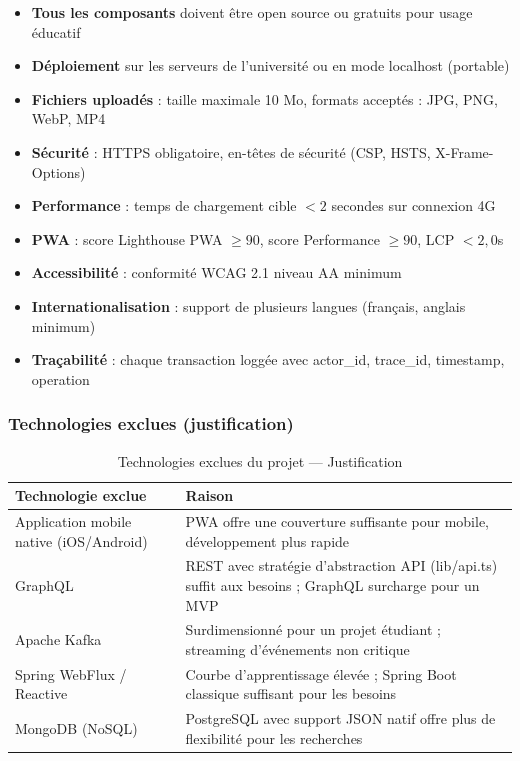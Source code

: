 \documentclass[12pt,a4paper]{report}
\begin{document}
\begin{itemize}[leftmargin=1.5cm]
  \item \textbf{Tous les composants} doivent être open source ou gratuits pour usage éducatif
  \item \textbf{Déploiement} sur les serveurs de l'université ou en mode localhost (portable)
  \item \textbf{Fichiers uploadés} : taille maximale 10 Mo, formats acceptés : JPG, PNG, WebP, MP4
  \item \textbf{Sécurité} : HTTPS obligatoire, en-têtes de sécurité (CSP, HSTS, X-Frame-Options)
  \item \textbf{Performance} : temps de chargement cible $< 2$ secondes sur connexion 4G
  \item \textbf{PWA} : score Lighthouse PWA $\geq 90$, score Performance $\geq 90$, LCP $< 2,0$s
  \item \textbf{Accessibilité} : conformité WCAG 2.1 niveau AA minimum
  \item \textbf{Internationalisation} : support de plusieurs langues (français, anglais minimum)
  \item \textbf{Traçabilité} : chaque transaction loggée avec actor\_id, trace\_id, timestamp, operation
\end{itemize}

\subsubsection*{Technologies exclues (justification)}

\begin{table}[H]
\centering
\caption{Technologies exclues du projet --- Justification}
\label{tab:excluded_tech}
\small
\begin{tabular}{|p{}|p{}|}
\hline
\textbf{Technologie exclue} & \textbf{Raison} \\
\hline
Application mobile native (iOS/Android) & PWA offre une couverture suffisante pour mobile, développement plus rapide \\
\hline
GraphQL & REST avec stratégie d'abstraction API (lib/api.ts) suffit aux besoins ; GraphQL surcharge pour un MVP \\
\hline
Apache Kafka & Surdimensionné pour un projet étudiant ; streaming d'événements non critique \\
\hline
Spring WebFlux / Reactive & Courbe d'apprentissage élevée ; Spring Boot classique suffisant pour les besoins \\
\hline
MongoDB (NoSQL) & PostgreSQL avec support JSON natif offre plus de flexibilité pour les recherches \\
\hline
\end{tabular}
\end{table}
\end{document}
